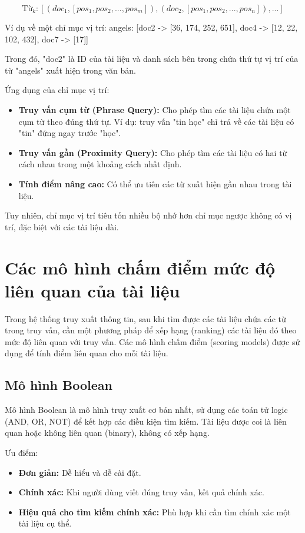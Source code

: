 \documentclass[../BTL.tex]{subfiles}
\begin{document}
$$\text{Từ}_k: [(doc_1, [pos_1, pos_2, ..., pos_m]), (doc_2, [pos_1, pos_2, ..., pos_n]), ...]$$

Ví dụ về một chỉ mục vị trí: angels: [doc2 -> [36, 174, 252, 651], doc4 -> [12, 22, 102, 432], doc7 -> [17]]

Trong đó, "doc2" là ID của tài liệu và danh sách bên trong chứa thứ tự vị trí của từ "angels" xuất hiện trong văn bản.

Ứng dụng của chỉ mục vị trí:
\begin{itemize}
    \item \textbf{Truy vấn cụm từ (Phrase Query):} Cho phép tìm các tài liệu chứa một cụm từ theo đúng thứ tự. Ví dụ: truy vấn "tin học" chỉ trả về các tài liệu có "tin" đứng ngay trước "học".
    
    \item \textbf{Truy vấn gần (Proximity Query):} Cho phép tìm các tài liệu có hai từ cách nhau trong một khoảng cách nhất định.
    
    \item \textbf{Tính điểm nâng cao:} Có thể ưu tiên các từ xuất hiện gần nhau trong tài liệu.
\end{itemize}

Tuy nhiên, chỉ mục vị trí tiêu tốn nhiều bộ nhớ hơn chỉ mục ngược không có vị trí, đặc biệt với các tài liệu dài.

\section{Các mô hình chấm điểm mức độ liên quan của tài liệu}
Trong hệ thống truy xuất thông tin, sau khi tìm được các tài liệu chứa các từ trong truy vấn, cần một phương pháp để xếp hạng (ranking) các tài liệu đó theo mức độ liên quan với truy vấn. Các mô hình chấm điểm (scoring models) được sử dụng để tính điểm liên quan cho mỗi tài liệu.

\subsection{Mô hình Boolean}
Mô hình Boolean là mô hình truy xuất cơ bản nhất, sử dụng các toán tử logic (AND, OR, NOT) để kết hợp các điều kiện tìm kiếm. Tài liệu được coi là liên quan hoặc không liên quan (binary), không có xếp hạng.

Ưu điểm:
\begin{itemize}
    \item \textbf{Đơn giản:} Dễ hiểu và dễ cài đặt.
    
    \item \textbf{Chính xác:} Khi người dùng viết đúng truy vấn, kết quả chính xác.
    
    \item \textbf{Hiệu quả cho tìm kiếm chính xác:} Phù hợp khi cần tìm chính xác một tài liệu cụ thể.
\end{itemize}
\end{document}
